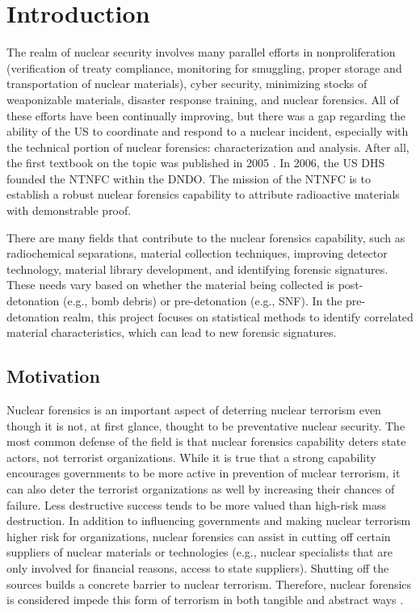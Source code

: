 \chapter{Introduction}
\label{ch:intro}

The realm of nuclear security involves many parallel efforts in
nonproliferation (verification of treaty compliance, monitoring for smuggling,
proper storage and transportation of nuclear materials), cyber security,
minimizing stocks of weaponizable materials, disaster response training, and
nuclear forensics. All of these efforts have been continually improving, but
there was a gap regarding the ability of the \gls{US} to coordinate and respond
to a nuclear incident, especially with the technical portion of nuclear
forensics: characterization and analysis. After all, the first textbook on the
topic was published in 2005 \cite{nftext_2005}. In 2006, the \gls{US} \gls{DHS}
founded the \gls{NTNFC} within the \gls{DNDO}. The mission of the \gls{NTNFC}
is to establish a robust nuclear forensics capability to attribute radioactive
materials with demonstrable proof.

There are many fields that contribute to the nuclear forensics capability, such
as radiochemical separations, material collection techniques, improving
detector technology, material library development, and identifying forensic
signatures. These needs vary based on whether the material being collected is
post-detonation (e.g., bomb debris) or pre-detonation (e.g., \gls{SNF}).  In
the pre-detonation realm, this project focuses on statistical methods to
identify correlated material characteristics, which can lead to new forensic
signatures. 


\section{Motivation}
\label{sec:motivation}

Nuclear forensics is an important aspect of deterring nuclear terrorism even
though it is not, at first glance, thought to be preventative nuclear security.
The most common defense of the field is that nuclear forensics capability
deters state actors, not terrorist organizations. While it is true that a
strong capability encourages governments to be more active in prevention of
nuclear terrorism, it can also deter the terrorist organizations as well by
increasing their chances of failure. Less destructive success tends to be more
valued than high-risk mass destruction. In addition to influencing governments
and making nuclear terrorism higher risk for organizations, nuclear forensics
can assist in cutting off certain suppliers of nuclear materials or
technologies (e.g., nuclear specialists that are only involved for financial
reasons, access to state suppliers).  Shutting off the sources builds a
concrete barrier to nuclear terrorism.  Therefore, nuclear forensics is
considered impede this form of terrorism in both tangible and abstract ways
\cite{aps_aaas_forensics}.


